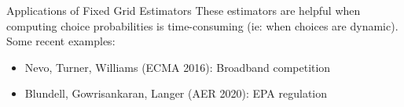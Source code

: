 \documentclass[aspectratio=169,10pt]{beamer}
\begin{document}
\begin{frame}{Applications of Fixed Grid Estimators}
These estimators are helpful when computing choice probabilities is time-consuming (ie: when choices are dynamic). Some recent examples:
\begin{itemize}
    \item Nevo, Turner, Williams (ECMA 2016): Broadband competition
    \item Blundell, Gowrisankaran, Langer (AER 2020): EPA regulation
\end{itemize}
\end{frame}










\end{document}

